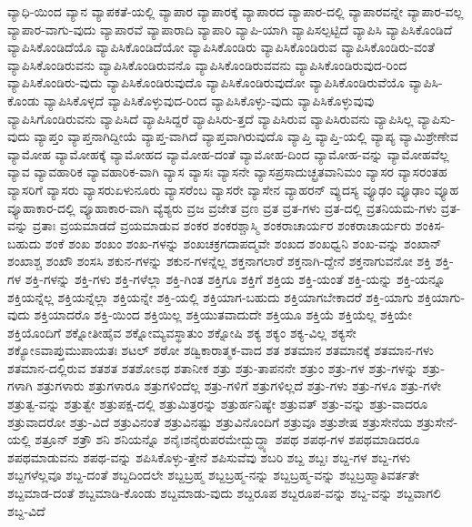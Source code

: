 {ವ್ಯಾಧಿ-ಯಿಂದ
ವ್ಯಾನ
ವ್ಯಾಪಕತೆ-ಯಲ್ಲಿ
ವ್ಯಾಪಾರ
ವ್ಯಾಪಾರಕ್ಕೆ
ವ್ಯಾಪಾರದ
ವ್ಯಾಪಾರ-ದಲ್ಲಿ
ವ್ಯಾಪಾರವನ್ನೇ
ವ್ಯಾಪಾರ-ವಲ್ಲ
ವ್ಯಾಪಾರ-ವಾಗು-ವುದು
ವ್ಯಾಪಾರವೆ
ವ್ಯಾಪಾರಾದಿ
ವ್ಯಾಪಾರಿ
ವ್ಯಾಪಿ-ಯಾಗಿ
ವ್ಯಾಪಿಸಲ್ಪಟ್ಟಿದೆ
ವ್ಯಾಪಿಸಿ
ವ್ಯಾಪಿಸಿಕೊಂಡಿದೆ
ವ್ಯಾಪಿಸಿಕೊಂಡಿದೆಯೊ
ವ್ಯಾಪಿಸಿಕೊಂಡಿದೆಯೋ
ವ್ಯಾಪಿಸಿಕೊಂಡಿರು
ವ್ಯಾಪಿಸಿಕೊಂಡಿರುವ
ವ್ಯಾಪಿಸಿಕೊಂಡಿರು-ವಂತೆ
ವ್ಯಾಪಿಸಿಕೊಂಡಿರುವನು
ವ್ಯಾಪಿಸಿಕೊಂಡಿರುವನೊ
ವ್ಯಾಪಿಸಿಕೊಂಡಿರುವವನು
ವ್ಯಾಪಿಸಿಕೊಂಡಿರುವುದ-ರಿಂದ
ವ್ಯಾಪಿಸಿಕೊಂಡಿರು-ವುದು
ವ್ಯಾಪಿಸಿಕೊಂಡಿರುವುದೊ
ವ್ಯಾಪಿಸಿಕೊಂಡಿರುವುದೋ
ವ್ಯಾಪಿಸಿಕೊಂಡಿರುವೆಯೊ
ವ್ಯಾಪಿಸಿ-ಕೊಂಡು
ವ್ಯಾಪಿಸಿಕೊಳ್ಳದೆ
ವ್ಯಾಪಿಸಿಕೊಳ್ಳುವುದ-ರಿಂದ
ವ್ಯಾಪಿಸಿಕೊಳ್ಳು-ವುದು
ವ್ಯಾಪಿಸಿಕೊಳ್ಳುವುವು
ವ್ಯಾಪಿಸಿಗೊಂಡಿರುವನು
ವ್ಯಾಪಿಸಿದೆ
ವ್ಯಾಪಿಸಿದ್ದರೆ
ವ್ಯಾಪಿಸಿರು-ತ್ತದೆ
ವ್ಯಾಪಿಸಿರುವ
ವ್ಯಾಪಿಸಿರುವನು
ವ್ಯಾಪಿಸಿಲ್ಲ
ವ್ಯಾಪಿಸು-ವುದು
ವ್ಯಾಪ್ತಂ
ವ್ಯಾಪ್ತನಾಗಿದ್ದೀಯೆ
ವ್ಯಾಪ್ತ-ವಾಗಿದೆ
ವ್ಯಾಪ್ತವಾಗಿರುವುದೊ
ವ್ಯಾಪ್ತಿ
ವ್ಯಾಪ್ತಿ-ಯಲ್ಲಿ
ವ್ಯಾಪ್ಯ
ವ್ಯಾಮಿಶ್ರೇಣೇವ
ವ್ಯಾಮೋಹ
ವ್ಯಾಮೋಹಕ್ಕೆ
ವ್ಯಾಮೋಹದ
ವ್ಯಾಮೋಹ-ದಂತೆ
ವ್ಯಾಮೋಹ-ದಿಂದ
ವ್ಯಾಮೋಹ-ವನ್ನು
ವ್ಯಾಮೋಹವೆಲ್ಲ
ವ್ಯಾವ
ವ್ಯಾವಹಾರಿಕ
ವ್ಯಾವಹಾರಿಕ-ವಾಗಿ
ವ್ಯಾಸ
ವ್ಯಾಸಃ
ವ್ಯಾಸನೇ
ವ್ಯಾಸಪ್ರಸಾದುಚ್ಛ್ರತವಾನಿಮಂ
ವ್ಯಾಸರ
ವ್ಯಾಸರಂತಹ
ವ್ಯಾಸರಿಗೆ
ವ್ಯಾಸರು
ವ್ಯಾಸರುಏಳುನೂರು
ವ್ಯಾಸರೆಂಬ
ವ್ಯಾಸರೇ
ವ್ಯಾಸೇನ
ವ್ಯಾಹರನ್
ವ್ಯುದಸ್ಯ
ವ್ಯೂಢಂ
ವ್ಯೂಢಾಂ
ವ್ಯೂಹ
ವ್ಯೂಹಾಕಾರ-ದಲ್ಲಿ
ವ್ಯೂಹಾಕಾರ-ವಾಗಿ
ವ್ಯೆಶ್ಯರು
ವ್ರಜ
ವ್ರಜೇತ
ವ್ರಣ
ವ್ರತ
ವ್ರತ-ಗಳು
ವ್ರತ-ದಲ್ಲಿ
ವ್ರತನಿಯಮ-ಗಳು
ವ್ರತ-ವನ್ನು
ವ್ರತಾಃ
ವ್ರಯಮಾಡದೆ
ವ್ರಯಮಾಡುವ
ಶಂಕರ
ಶಂಕರಶ್ಚಾಸ್ಮಿ
ಶಂಕರಾಚಾರ್ಯರ
ಶಂಕರಾಚಾರ್ಯರು
ಶಂಕಿಸ-ಬಹುದು
ಶಂಕೆ
ಶಂಖ
ಶಂಖಂ
ಶಂಖ-ಗಳನ್ನು
ಶಂಖಚಕ್ರಗದಾಪದ್ಮವೇ
ಶಂಖದ
ಶಂಖಧ್ವನಿ
ಶಂಖ-ವನ್ನು
ಶಂಖಾನ್
ಶಂಖಾಶ್ಚ
ಶಂಖೌ
ಶಂಸಸಿ
ಶಕುನ-ಗಳನ್ನು
ಶಕುನ-ಗಳನ್ನೆಲ್ಲ
ಶಕ್ತನಾಗಲಾರೆ
ಶಕ್ತನಾಗಿ-ದ್ದೇನೆ
ಶಕ್ತನಾಗುವನೋ
ಶಕ್ತಿ
ಶಕ್ತಿ-ಗಳ
ಶಕ್ತಿ-ಗಳನ್ನು
ಶಕ್ತಿ-ಗಳು
ಶಕ್ತಿ-ಗಳೆಲ್ಲಾ
ಶಕ್ತಿ-ಗಿಂತ
ಶಕ್ತಿಗೂ
ಶಕ್ತಿಗೆ
ಶಕ್ತಿಯ
ಶಕ್ತಿ-ಯಂತೆ
ಶಕ್ತಿ-ಯನ್ನು
ಶಕ್ತಿ-ಯನ್ನೂ
ಶಕ್ತಿಯನ್ನೆಲ್ಲ
ಶಕ್ತಿಯನ್ನೆಲ್ಲಾ
ಶಕ್ತಿಯನ್ನೇ
ಶಕ್ತಿ-ಯಲ್ಲಿ
ಶಕ್ತಿಯಾಗ-ಬಹುದು
ಶಕ್ತಿಯಾಗಬೇಕಾದರೆ
ಶಕ್ತಿ-ಯಾಗು
ಶಕ್ತಿಯಾಗು-ವುದು
ಶಕ್ತಿಯಾದರೊ
ಶಕ್ತಿ-ಯಿಂದ
ಶಕ್ತಿಯಿಲ್ಲ
ಶಕ್ತಿಯುತವಾದುದೇ
ಶಕ್ತಿಯೂ
ಶಕ್ತಿಯೆ
ಶಕ್ತಿಯೆಲ್ಲ
ಶಕ್ತಿಯೇ
ಶಕ್ತಿಯೊಂದಿಗೆ
ಶಕ್ನೋತೀಹೈವ
ಶಕ್ನೋಮ್ಯವಸ್ಥಾತುಂ
ಶಕ್ನೋಷಿ
ಶಕ್ಯ
ಶಕ್ಯಂ
ಶಕ್ಯ-ವಿಲ್ಲ
ಶಕ್ಯಸೇ
ಶಕ್ಯೋಽವಾಪ್ತುಮುಪಾಯತಃ
ಶಟಲ್
ಶಠೋ
ಶಡ್ವಿಕಾರಾತ್ಮಕ-ವಾದ
ಶತ
ಶತಮಾನ
ಶತಮಾನಕ್ಕೆ
ಶತಮಾನ-ಗಳು
ಶತಮಾನ-ದಲ್ಲಿರುವ
ಶತಶತ
ಶತಶೋಽಥ
ಶತಾನೀಕ
ಶತ್ರು
ಶತ್ರು-ತಾಪನನೇ
ಶತ್ರುಂ
ಶತ್ರು-ಗಳ
ಶತ್ರು-ಗಳನ್ನು
ಶತ್ರು-ಗಳಾಗಿ
ಶತ್ರುಗಳಾರು
ಶತ್ರುಗಳಾರೂ
ಶತ್ರುಗಳಿಂದೆಲ್ಲ
ಶತ್ರು-ಗಳಿಗೆ
ಶತ್ರುಗಳಿಲ್ಲದೆ
ಶತ್ರು-ಗಳು
ಶತ್ರು-ಗಳೂ
ಶತ್ರು-ಗಳೇ
ಶತ್ರುತ್ವ-ವನ್ನು
ಶತ್ರುತ್ವೇ
ಶತ್ರುಪಕ್ಷ-ದಲ್ಲಿ
ಶತ್ರುಮಿತ್ರರನ್ನು
ಶತ್ರುರ್ಹನಿಷ್ಯೇ
ಶತ್ರುವತ್
ಶತ್ರು-ವನ್ನು
ಶತ್ರು-ವಾದರೂ
ಶತ್ರುವಾದರೋ
ಶತ್ರು-ವಿದೆ
ಶತ್ರುವಿನಂತೆ
ಶತ್ರುವಿನಷ್ಟು
ಶತ್ರುವಿನೊಂದಿಗೆ
ಶತ್ರುವೂ
ಶತ್ರುಶೇಷ
ಶತ್ರುಸೇನೆಯ
ಶತ್ರುಸೇನೆ-ಯಲ್ಲಿ
ಶತ್ರೂನ್
ಶತ್ರೌ
ಶನಿ
ಶನಿಯನ್ನೊ
ಶನೈಃಶನೈರುಪರಮೇದ್ಬುದ್ಧ್ಯಾ
ಶಪಥ
ಶಪಥ-ಗಳ
ಶಪಥಮಾಡಿದರೂ
ಶಪಥಮಾಡುವನು
ಶಪಥ-ವನ್ನು
ಶಪಿಸಿಕೊಳ್ಳು-ತ್ತೇನೆ
ಶಪಿಸುವೆವು
ಶಬರಿ
ಶಬ್ದ
ಶಬ್ದಃ
ಶಬ್ದ-ಗಳ
ಶಬ್ದ-ಗಳು
ಶಬ್ದಗಳೆಲ್ಲವೂ
ಶಬ್ದ-ದಂತೆ
ಶಬ್ದದಿಂದಲೇ
ಶಬ್ದಬ್ರಹ್ಮ
ಶಬ್ದಬ್ರಹ್ಮ-ನನ್ನು
ಶಬ್ದಬ್ರಹ್ಮ-ವನ್ನು
ಶಬ್ದಬ್ರಹ್ಮಾತಿವರ್ತತೇ
ಶಬ್ದಮಾಡ-ದಂತೆ
ಶಬ್ದಮಾಡಿ-ಕೊಂಡು
ಶಬ್ದಮಾಡು-ವುದು
ಶಬ್ದರೂಪ
ಶಬ್ದರೂಪ-ವನ್ನು
ಶಬ್ದ-ವನ್ನು
ಶಬ್ದವಾಗಲಿ
ಶಬ್ದ-ವಿದೆ
}
